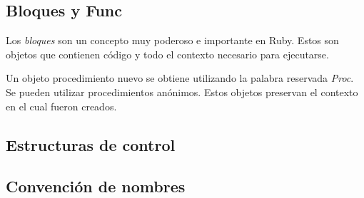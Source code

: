 \documentclass{article}
\begin{document}
 

 

 


\subsection{Bloques y Func}

Los \textit{bloques} son un concepto muy poderoso e importante en Ruby. Estos son objetos que contienen código y todo el contexto necesario para ejecutarse.

 
\bigskip

Un objeto procedimiento nuevo se obtiene utilizando la palabra reservada \textit{Proc}. Se pueden utilizar procedimientos anónimos. Estos objetos preservan el contexto en el cual fueron creados.

 

 

 

 
\bigskip


\subsection{Estructuras de control}


\bigskip


\subsection{Convención de nombres}
\end{document}
